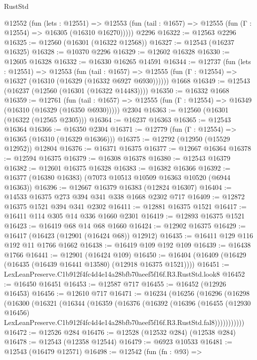 \begin{lexlean}{RustStd}
\begin{coremodule}
    @12552
      (fun (lets : @12551) =>
      @12553 (fun (tail : @1657) => @12555 (fun (Γ : @12554) => @16305 (@16310 @16270)))))
    @2296
@16322 := @12563 @2296
@16325 := @12560 (@16301 (@16322 @12568))
@16327 := @12543 (@16237 @16325)
@16328 := @10370 @2296
@16329 := @12602 @16328
@16330 := @12605 @16328
@16332 := @16330 @16265 @14591
@16344 := @12737
    (fun (lets : @12551) =>
    @12553
      (fun (tail : @1657) =>
      @12555 (fun (Γ : @12554) => @16327 (@16310 (@16329 (@16332 @6927 @6930))))))
    @1668
@16349 := @12543 (@16237 (@12560 (@16301 (@16322 @14483))))
@16350 := @16332 @1668
@16359 := @12761
    (fun (tail : @1657) => @12555 (fun (Γ : @12554) => @16349 (@16310 (@16329 (@16350 @6930)))))
    @2304
@16363 := @12560 (@16301 (@16322 (@12565 @2305)))
@16364 := @16237 @16363
@16365 := @12543 @16364
@16366 := @16350 @2304
@16371 := @12779 (fun (Γ : @12554) => @16365 (@16310 (@16329 @16366)))
@16375 := @12792 (@12950 (@15529 @12952)) @12804
@16376 := @16371 @16375
@16377 := @12667 @16364
@16378 := @12594 @16375
@16379 := @16308 @16378
@16380 := @12543 @16379
@16382 := @12601 @16375 @16328
@16383 := @16382 @16366
@16392 := @16377 (@16380 @16383) (@7073 @10513 @10509 @16363 @10520 (@6944 @16363))
@16396 := @12667 @16379 @16383 (@12824 @16307)
@16404 := @14533 @16375 @273 @394 @341 @338 @1668 @2302 @717
@16409 := @12872 @16375 @1521 @394 @341 @2302
@16411 := @12881 @16375 @1521
@16417 := @16411 @114 @305 @14 @336 @1660 @2301
@16419 := @12893 @16375 @1521
@16423 := @16419 @68 @14 @68 @1660
@16424 := @12902 @16375
@16429 := @16417 (@16423 (@12901 (@16424 @68)) @12912)
@16435 := @16411 @129 @116 @192 @11 @1766 @1662
@16438 := @16419 @109 @192 @109
@16439 := @16438 @1766
@16441 := @12901 (@16424 @109)
@16450 := @16404 (@16409 (@16429 (@16435 (@16439 @16441 @13580) (@12918 @16375 @1521))))
@16451 := LexLeanPreserve.C1b912f4fc4d4e14a28bfb70aeef5f16f.R3.RustStd.look8
@16452 := @16450 @16451
@16453 := @12587 @717
@16455 := @16452 (@12926 @16453)
@16456 := @12610 @717
@16471 := @16234
    (@16256
      (@16296
        (@16298
          (@16300
            (@16321
              (@16344
                (@16359
                  (@16376
                    (@16392
                      (@16396
                        (@16455
                          (@12930 @16456)
                          LexLeanPreserve.C1b912f4fc4d4e14a28bfb70aeef5f16f.R3.RustStd.fal8)))))))))))
@16472 := @12526 @284
@16476 := @12528 (@12532 @284) (@12538 @284)
@16478 := @12543 (@12358 @12544)
@16479 := @6923 @10533
@16481 := @12543 (@16479 @12571)
@16498 := @12542
    (fun (fn : @93) =>

\end{coremodule}
\end{lexlean}
